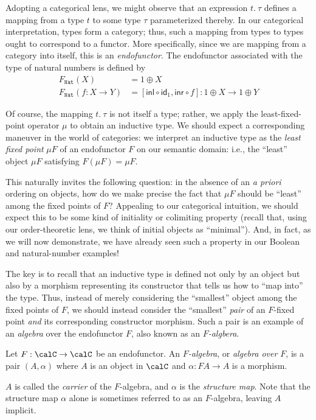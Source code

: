Adopting a categorical lens, we might observe that an expression $t.~\tau$ defines a mapping from a
type $t$ to some type $\tau$ parameterized thereby. In our categorical interpretation, types form a
category; thus, such a mapping from types to types ought to correspond to a functor. More
specifically, since we are mapping from a category into itself, this is an \emph{endofunctor}. The
endofunctor associated with the type of natural numbers is defined by
\begin{align*}
  F_\texttt{Nat}(X) &= 1 \oplus X\\
  F_\texttt{Nat}(f : X \to Y) &= [\mathsf{inl} \circ \mathsf{id}_1, \mathsf{inr} \circ f] : 1 \oplus X \to 1 \oplus Y
\end{align*}

Of course, the mapping $t.~\tau$ is not itself a type; rather, we apply the least-fixed-point
operator $\mu$ to obtain an inductive type. We should expect a corresponding maneuver in the world
of categories: we interpret an inductive type as the \emph{least fixed point} $\mu F$ of an
endofunctor $F$ on our semantic domain: i.e., the ``least'' object $\mu F$ satisfying $F(\mu F) =
\mu F$.

This naturally invites the following question: in the absence of an \emph{a priori} ordering on
objects, how do we make precise the fact that $\mu F$ should be ``least'' among the fixed points of
$F$? Appealing to our categorical intuition, we should expect this to be some kind of initiality or
colimiting property (recall that, using our order-theoretic lens, we think of initial objects as
``minimal''). And, in fact, as we will now demonstrate, we have already seen such a property in our
Boolean and natural-number examples!

The key is to recall that an inductive type is defined not only by an object but also by a morphism
representing its constructor that tells us how to ``map into'' the type. Thus, instead of merely
considering the ``smallest'' object among the fixed points of $F$, we should instead consider the
``smallest'' \emph{pair} of an $F$-fixed point \emph{and} its corresponding constructor morphism.
Such a pair is an example of an \emph{algebra} over the endofunctor $F$, also known as an
\emph{$F$-algbera}.

\begin{definition}[$F$-Algebra]
\sloppy
  Let $F : \calC \to \calC$ be an endofunctor. An \emph{$F$-algebra}, or \emph{algebra over $F$}, is
  a pair $(A, \alpha)$ where $A$ is an object in $\calC$ and $\alpha : F A \to A$ is a morphism.
  
  $A$ is called the \emph{carrier} of the $F$-algebra, and $\alpha$ is the \emph{structure map}.
  Note that the structure map $\alpha$ alone is sometimes referred to as an $F$-algebra, leaving $A$
  implicit.
\end{definition}

